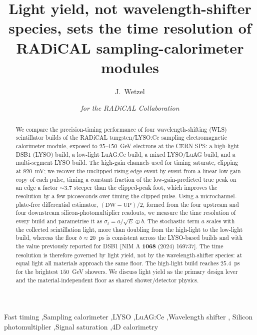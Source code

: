 \documentclass[final,5p,times,twocolumn]{elsarticle}
\begin{document}
\begin{frontmatter}

\title{Light yield, not wavelength-shifter species, sets the time resolution
of RADiCAL sampling-calorimeter modules}

\author[uiowa]{J.~Wetzel}
\author[radical]{\textit{for the RADiCAL Collaboration}}

\begin{abstract}
We compare the precision-timing performance of four wavelength-shifting (WLS)
scintillator builds of the RADiCAL tungsten/LYSO:Ce sampling electromagnetic
calorimeter module, exposed to $25$--$150$~GeV electrons at the CERN SPS: a
high-light DSB1 (LYSO) build, a low-light LuAG:Ce build, a mixed LYSO/LuAG build,
and a multi-segment LYSO build. The high-gain channels used for timing saturate,
clipping at $820$~mV; we recover the unclipped rising edge event by event from a
linear low-gain copy of each pulse, timing a constant fraction of the
low-gain-predicted true peak on an edge a factor $\sim3.7$ steeper than the
clipped-peak foot, which improves the resolution by a few picoseconds over timing the
clipped pulse. Using a microchannel-plate-free differential estimator,
$(\mathrm{DW}-\mathrm{UP})/2$, formed from the four upstream and four downstream
silicon-photomultiplier readouts, we measure the time resolution of every build and
parametrise it as $\sigma_t = a/\sqrt{E}\oplus b$. The stochastic term $a$ scales
with the collected scintillation light, more than doubling from the high-light to the
low-light build, whereas the floor $b\approx20$~ps is consistent across the
LYSO-based builds and with the value previously reported for DSB1
[NIM A \textbf{1068} (2024) 169737]. The time resolution is therefore governed by
light yield, not by the wavelength-shifter species: at equal light all materials
approach the same floor. The high-light build reaches $25.4$~ps for the brightest
$150$~GeV showers. We discuss light yield as the primary design lever and the
material-independent floor as shared shower/detector physics.
\end{abstract}

\begin{keyword}
Fast timing \sep Sampling calorimeter \sep LYSO \sep LuAG:Ce \sep Wavelength shifter \sep
Silicon photomultiplier \sep Signal saturation \sep 4D calorimetry
\end{keyword}

\end{frontmatter}
\end{document}
